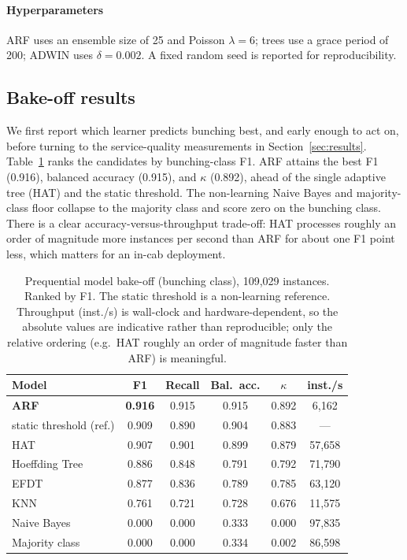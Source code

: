 \documentclass[final,5p,times,twocolumn,authoryear]{elsarticle}
\begin{document}
\paragraph{Hyperparameters}
ARF uses an ensemble size of 25 and Poisson $\lambda = 6$; trees use a grace period of 200;
ADWIN uses $\delta = 0.002$. A fixed random seed is reported for reproducibility.

\subsection{Bake-off results}
\label{sec:bakeoff}

We first report which learner predicts bunching best, and early enough to act on, before turning to
the service-quality measurements in Section~\ref{sec:results}. Table~\ref{tab:bakeoff} ranks the
candidates by bunching-class F1. ARF attains the best F1 (0.916), balanced accuracy (0.915), and
$\kappa$ (0.892), ahead of the single adaptive tree (HAT) and the static threshold. The non-learning
Naive Bayes and majority-class floor collapse to the majority class and score zero on the bunching
class. There is a clear accuracy-versus-throughput trade-off: HAT processes roughly an order of
magnitude more instances per second than ARF for about one F1 point less, which matters for an in-cab
deployment.

\begin{table}[t]
\centering
\caption{Prequential model bake-off (bunching class), 109{,}029 instances. Ranked by F1.
The static threshold is a non-learning reference. Throughput (inst./s) is wall-clock and
hardware-dependent, so the absolute values are indicative rather than reproducible; only the
relative ordering (e.g.\ HAT roughly an order of magnitude faster than ARF) is meaningful.}
\label{tab:bakeoff}
\begin{tabular}{lccccc}
\toprule
Model & F1 & Recall & Bal.\ acc. & $\kappa$ & inst./s \\
\midrule
\textbf{ARF}                 & \textbf{0.916} & 0.915 & 0.915 & 0.892 & 6{,}162 \\
static threshold (ref.)      & 0.909 & 0.890 & 0.904 & 0.883 & --- \\
HAT                          & 0.907 & 0.901 & 0.899 & 0.879 & 57{,}658 \\
Hoeffding Tree               & 0.886 & 0.848 & 0.791 & 0.792 & 71{,}790 \\
EFDT                         & 0.877 & 0.836 & 0.789 & 0.785 & 63{,}120 \\
KNN                          & 0.761 & 0.721 & 0.728 & 0.676 & 11{,}575 \\
Naive Bayes                  & 0.000 & 0.000 & 0.333 & 0.000 & 97{,}835 \\
Majority class               & 0.000 & 0.000 & 0.334 & 0.002 & 86{,}598 \\
\bottomrule
\end{tabular}
\end{table}
\end{document}
